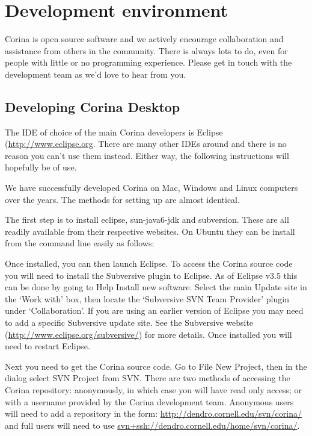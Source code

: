 \chapter{Development environment}

Corina is open source software and we actively encourage collaboration and assistance from others in the community.  There is always lots to do, even for people with little or no programming experience.  Please get in touch with the development team as we'd love to hear from you.

\section{Developing Corina Desktop}

The IDE of choice of the main Corina developers is Eclipse (\url{http://www.eclipse.org}. There are many other IDEs around and there is no reason you can't use them instead.  Either way, the following instructions will hopefully be of use.

We have successfully developed Corina on Mac, Windows and Linux computers over the years.  The methods for setting up are almost identical.  

The first step is to install eclipse, sun-java6-jdk and subversion.  These are all readily available from their respective websites.  On Ubuntu they can be install from the command line easily as follows:


Once installed, you can then launch Eclipse.  To access the Corina source code you will need to install the Subversive plugin to Eclipse.  As of Eclipse v3.5 this can be done by going to Help \MVRightarrow Install new software.  Select the main Update site in the `Work with' box, then locate the `Subversive SVN Team Provider' plugin under `Collaboration'.  If you are using an earlier version of Eclipse you may need to add a specific Subversive update site.  See the Subversive website (\url{http://www.eclipse.org/subversive/}) for more details.  Once installed you will need to restart Eclipse.

Next you need to get the Corina source code.  Go to File \MVRightarrow New \MVRightarrow Project, then in the dialog select SVN \MVRightarrow Project from SVN.  There are two methods of accessing the Corina repository: anonymously, in which case you will have read only access; or with a username provided by the Corina development team.  Anonymous users will need to add a repository in the form: \url{http://dendro.cornell.edu/svn/corina/} and full users will need to use \url{svn+ssh://dendro.cornell.edu/home/svn/corina/}.

